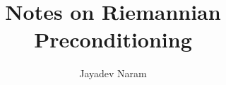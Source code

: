 \documentclass[11pt,a4paper]{article}
\author{Jayadev Naram}
\title{Notes on Riemannian Preconditioning}
\begin{document}
\date{}
\maketitle
\tableofcontents
\newpage

\theoremstyle{plain}
\newtheorem{theorem}{Theorem}[section]
\newtheorem{corollary}[theorem]{Corollary}
\newtheorem{lemma}[theorem]{Lemma}
\newtheorem{prop}[theorem]{Proposition}
\newtheorem{remark}[theorem]{Remark}
\newtheorem{example}[theorem]{Example}
\newtheorem{assume}{Assumption}

\theoremstyle{definition}
\newtheorem{mydef}[theorem]{Definition}


\newcommand{\R}{\mathbb{R}}
\newcommand{\A}{\mathcal{A}}
\newcommand{\M}{\mathcal{M}}
\newcommand{\N}{\mathcal{N}}
\newcommand{\T}{\mathcal{T}}
\newcommand{\Proj}{\mathcal{P}}
\newcommand{\perpProj}{\mathcal{P}^\perp}
\newcommand{\bb}{\mathbb{B}}
\newcommand{\Sprod}{\mathbb{S}_{xy}}
\newcommand{\highlight}[1]{\textsl{\textbf{#1}}}
\newcommand{\mapping}[3]{#1:#2\rightarrow #3}
\newcommand{\doubt}{\highlight{[??]}}
\newcommand{\bigvert}[2]{\left.#1\right|_{#2}}
\newcommand{\sdnn}[1]{${#1}$}
\newcommand{\bsdnn}[1]{$\boldsymbol{#1}$}
\newcommand{\ifthen}[2]{\textbf{(#1)}\boldsymbol{\implies}\textbf{(#2)}}
\newcommand{\bsdn}[1]{\boldsymbol{#1}}
\newcommand{\forward}{$(\implies)$}
\newcommand{\converse}{$(\impliedby)$}
\newcommand{\Lt}[1]{\underset{#1\rightarrow 0}{Lt}}
\newcommand{\norm}[1]{\|#1\|}
\newcommand{\dparder}[2]{\dfrac{\partial #1}{\partial x_{#2}}}
\newcommand{\fparder}[2]{\frac{\partial #1}{\partial x_{#2}}}
\newcommand{\parder}[2]{\partial #1/\partial x_{#2}}
\newcommand{\parop}[1]{\dfrac{\partial}{\partial x_{#1}}}
\newcommand{\innerproduct}[2]{\langle #1, #2 \rangle}
\newcommand{\genst}{St_B(n,p)}
\newcommand{\igenst}[1]{St_{B_{#1}}(n_{#1},p)}
\newcommand{\realmat}[2]{\R^{#1\times #2}}
\newcommand{\Skew}{\mathcal{S}_{skew}(p)}
\newcommand{\Sym}{\mathcal{S}_{sym}(p)}
\newcommand{\XperpB}{X_{B^\perp}}
\newcommand{\polarRetr}{R^{polar}_X}
\newcommand{\qrRetr}{R^{QR}_X}
\newcommand{\vectransport}{\mathcal{T}}
\newcommand{\grad}{\text{grad}\,}
\newcommand{\hess}{\text{Hess}\,}
\newcommand{\lift}{\text{lift}}
\end{document}
